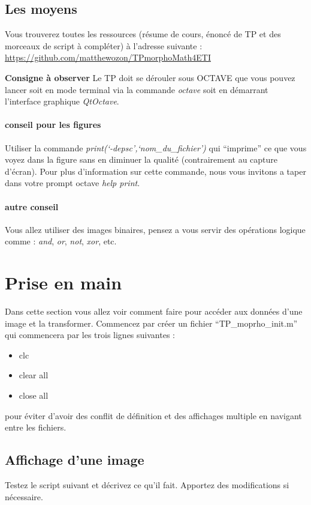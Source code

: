 \documentclass[10pt,a4paper]{article}
\begin{document}
\subsection{Les moyens}
Vous trouverez toutes les ressources (r\'{e}sume de cours, \'{e}nonc\'{e} de TP et des morceaux de script \`{a} compl\'{e}ter) \`{a} l'adresse suivante : \url{https://github.com/matthewozon/TPmorphoMath4ETI}

\noindent\textbf{Consigne \`{a} observer} Le TP doit se d\'{e}rouler sous OCTAVE que vous pouvez lancer soit en mode terminal via la commande \textit{octave} soit en d\'{e}marrant l'interface graphique \textit{QtOctave}.


\paragraph{conseil pour les figures} Utiliser la commande  \textit{print(`-depsc',`nom\_du\_fichier')}  qui ``imprime'' ce que vous voyez dans la figure sans en diminuer la qualit\'{e} (contrairement au capture d’\'{e}cran). Pour plus d'information sur cette commande, nous vous invitons a taper dans votre prompt octave \textit{help print}.

\paragraph{autre conseil} Vous allez utiliser des images binaires, pensez a vous servir des op\'{e}rations logique comme : \textit{and}, \textit{or}, \textit{not}, \textit{xor}, etc.




\section{Prise en main}
Dans cette section vous allez voir comment faire pour acc\'{e}der aux donn\'{e}es d'une image et la transformer. Commencez par cr\'{e}er un fichier ``TP\_moprho\_init.m'' qui commencera par les trois lignes suivantes : 
\begin{itemize}
	\item[] clc
	\item[] clear all
	\item[] close all
\end{itemize}
pour \'{e}viter d'avoir des conflit de d\'{e}finition et des affichages multiple en navigant entre les fichiers.

\subsection{Affichage d'une image}
Testez le script suivant et d\'{e}crivez ce qu'il fait. Apportez des modifications si n\'{e}cessaire.
\end{document}
